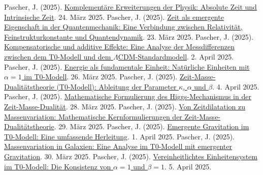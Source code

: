 \documentclass[12pt,a4paper]{article}
\begin{document}
	\begin{thebibliography}{99}
		 Pascher, J. (2025). \href{https://github.com/jpascher/T0-Time-Mass-Duality/tree/main/2/pdf/Deutsch/KomplementPhysikZeit.pdf}{Komplementäre Erweiterungen der Physik: Absolute Zeit und Intrinsische Zeit}. 24. März 2025.
		 Pascher, J. (2025). \href{https://github.com/jpascher/T0-Time-Mass-Duality/tree/main/2/pdf/Deutsch/NatEinheitenAlpha1.pdf}{Zeit als emergente Eigenschaft in der Quantenmechanik: Eine Verbindung zwischen Relativität, Feinstrukturkonstante und Quantendynamik}. 23. März 2025.
		 Pascher, J. (2025). \href{https://github.com/jpascher/T0-Time-Mass-Duality/tree/main/2/pdf/Deutsch/MessdifferenzenT0Standard.pdf}{Kompensatorische und additive Effekte: Eine Analyse der Messdifferenzen zwischen dem T0-Modell und dem \(\Lambda\)CDM-Standardmodell}. 2. April 2025.
		 Pascher, J. (2025). \href{https://github.com/jpascher/T0-Time-Mass-Duality/tree/main/2/pdf/Deutsch/NatEinheitenAlpha1.pdf}{Energie als fundamentale Einheit: Natürliche Einheiten mit \(\alpha = 1\) im T0-Modell}. 26. März 2025.
		 Pascher, J. (2025). \href{https://github.com/jpascher/T0-Time-Mass-Duality/tree/main/2/pdf/Deutsch/ZeitMasseT0Params.pdf}{Zeit-Masse-Dualitätstheorie (T0-Modell): Ableitung der Parameter \(\kappa\), \(\alpha\) und \(\beta\)}. 4. April 2025.
		 Pascher, J. (2025). \href{https://github.com/jpascher/T0-Time-Mass-Duality/tree/main/2/pdf/Deutsch/MathHiggsZeitMasse.pdf}{Mathematische Formulierung des Higgs-Mechanismus in der Zeit-Masse-Dualität}. 28. März 2025.
		 Pascher, J. (2025). \href{https://github.com/jpascher/T0-Time-Mass-Duality/tree/main/2/pdf/Deutsch/MathZeitMasseLagrange.pdf}{Von Zeitdilatation zu Massenvariation: Mathematische Kernformulierungen der Zeit-Masse-Dualitätstheorie}. 29. März 2025.
		 Pascher, J. (2025). \href{https://github.com/jpascher/T0-Time-Mass-Duality/tree/main/2/pdf/Deutsch/EmergentGravT0.pdf}{Emergente Gravitation im T0-Modell: Eine umfassende Herleitung}. 1. April 2025.
		 Pascher, J. (2025). \href{https://github.com/jpascher/T0-Time-Mass-Duality/tree/main/2/pdf/Deutsch/MassVarGalaxien.pdf}{Massenvariation in Galaxien: Eine Analyse im T0-Modell mit emergenter Gravitation}. 30. März 2025.
		 Pascher, J. (2025). \href{https://github.com/jpascher/T0-Time-Mass-Duality/tree/main/2/pdf/Deutsch/Alpha1Beta1Konsistenz.pdf}{Vereinheitlichtes Einheitensystem im T0-Modell: Die Konsistenz von \(\alpha = 1\) und \(\beta = 1\)}. 5. April 2025.

\end{thebibliography}
\end{document}
